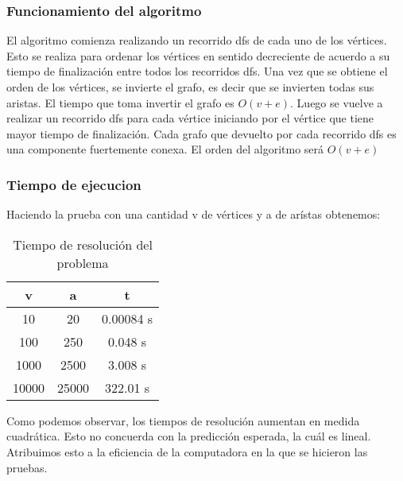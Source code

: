 \documentclass{article}
\begin{document}
            \subsubsection{Funcionamiento del algoritmo}
                El algoritmo comienza realizando un recorrido dfs de cada uno de los
                vértices. Esto se realiza para ordenar los vértices en sentido
                decreciente de acuerdo a su tiempo de finalización entre todos los
                recorridos dfs. Una vez que se obtiene el orden de los vértices,
                se invierte el grafo, es decir que se invierten todas sus aristas.
                El tiempo que toma invertir el grafo es $O(v+e)$. Luego se vuelve a
                realizar un recorrido dfs para cada vértice iniciando por el vértice
                que tiene mayor tiempo de finalización. Cada grafo que devuelto por cada
                recorrido dfs es una componente fuertemente conexa.
                El orden del algoritmo será $O(v+e)$

            \subsubsection{Tiempo de ejecucion}
              Haciendo la prueba con una cantidad v de vértices y a de arístas obtenemos:
                \begin{table}[h!]
                    \centering
                    \caption{Tiempo de resolución del problema}
                    \begin{tabular}{c|c|c}
                        v & a & t \\
                        \hline
                        10 & 20 & 0.00084 s \\
                        \hline
                        100 & 250 & 0.048 s \\
                        \hline
                        1000 & 2500 & 3.008 s \\
                        \hline
                        10000 & 25000 & 322.01 s
                    \end{tabular}
                \end{table}

                Como podemos observar, los tiempos de resolución aumentan en medida
                cuadrática. Esto no concuerda con la predicción esperada, la cuál es
                lineal. Atribuimos esto a la eficiencia de la computadora en la que
                se hicieron las pruebas.
\end{document}
